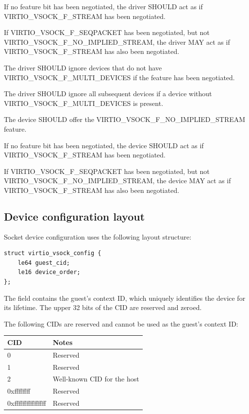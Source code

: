If no feature bit has been negotiated, the driver SHOULD act as if
VIRTIO_VSOCK_F_STREAM has been negotiated.

If VIRTIO_VSOCK_F_SEQPACKET has been negotiated, but not
VIRTIO_VSOCK_F_NO_IMPLIED_STREAM, the driver MAY act as if
VIRTIO_VSOCK_F_STREAM has also been negotiated.

The driver SHOULD ignore devices that do not have
VIRTIO_VSOCK_F_MULTI_DEVICES if the feature has been negotiated.

The driver SHOULD ignore all subsequent devices if a device without
VIRTIO_VSOCK_F_MULTI_DEVICES is present.


The device SHOULD offer the VIRTIO_VSOCK_F_NO_IMPLIED_STREAM feature.

If no feature bit has been negotiated, the device SHOULD act as if
VIRTIO_VSOCK_F_STREAM has been negotiated.

If VIRTIO_VSOCK_F_SEQPACKET has been negotiated, but not
VIRTIO_VSOCK_F_NO_IMPLIED_STREAM, the device MAY act as if
VIRTIO_VSOCK_F_STREAM has also been negotiated.

\subsection{Device configuration layout}\label{sec:Device Types / Socket Device / Device configuration layout}

Socket device configuration uses the following layout structure:

\begin{lstlisting}
struct virtio_vsock_config {
	le64 guest_cid;
	le16 device_order;
};
\end{lstlisting}

The  field contains the guest's context ID, which uniquely
identifies the device for its lifetime.  The upper 32 bits of the CID are
reserved and zeroed.

The following CIDs are reserved and cannot be used as the guest's context ID:

\begin{tabular}{|l|l|}
\hline
CID    & Notes \\
\hline \hline
0                 & Reserved \\
\hline
1                 & Reserved \\
\hline
2                 & Well-known CID for the host \\
\hline
0xffffffff        & Reserved \\
\hline
0xffffffffffffffff        & Reserved \\
\hline
\end{tabular}


